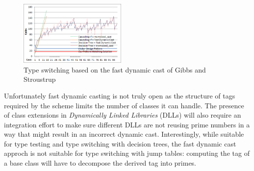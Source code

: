 \begin{figure}[htbp]
  \centering
    \includegraphics[width=0.47\textwidth]{DCast-vs-Visitors2.png}
  \caption{Type switching based on the fast dynamic cast of Gibbs and Stroustrup~\cite{FastDynCast}}
  \label{fig:DCastVis2}
\end{figure}


Unfortunately fast dynamic casting is not truly open as the structure of tags 
required by the scheme limits the number of classes it can handle. 
The presence of class extensions in \emph{Dynamically Linked Libraries} (DLLs) 
will also require an integration effort to make sure different DLLs are not 
reusing prime numbers in a way that might result in an incorrect dynamic cast.
Interestingly, while suitable for type testing and type switching with decision 
trees, the fast dynamic cast approch is not suitable for type switching with 
jump tables: computing the tag of a base class will have to decompose the 
derived tag into primes.


